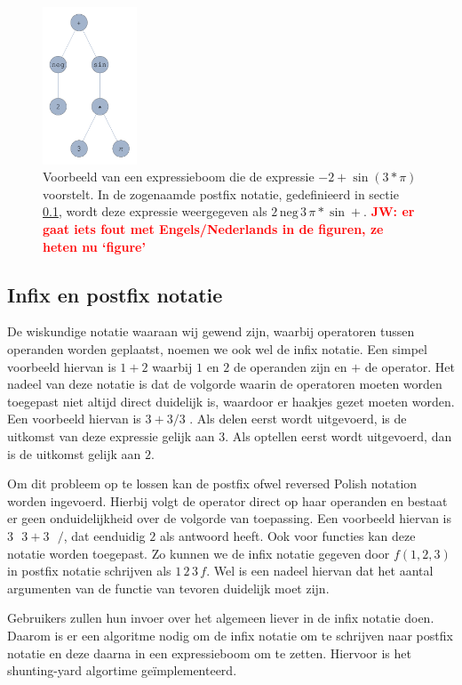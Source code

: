\documentclass[a4paper]{article}
\newcommand{\rcom}[1]{\textbf{\textcolor{red}{#1}}}
\begin{document}
\begin{figure}[!htb]
	\centering
	\includegraphics[width=0.25\textwidth]{expressionTree}
	\caption{Voorbeeld van een expressieboom die de expressie $-2+\sin(3 * \pi)$ voorstelt. In de zogenaamde postfix notatie, gedefinieerd in sectie \ref{sec:postfix}, wordt deze expressie weergegeven als $2\, \mathrm{neg}\,3\,\pi*\sin +$. \rcom{JW: er gaat iets fout met Engels/Nederlands in de figuren, ze heten nu `figure'}} \label{fig:boom}
\end{figure}

\subsection{Infix en postfix notatie}\label{sec:postfix}
De wiskundige notatie waaraan wij gewend zijn, waarbij operatoren tussen operanden worden geplaatst, noemen we ook wel de infix notatie. Een simpel voorbeeld hiervan is $1 + 2$  waarbij $1$ en $2$ de operanden zijn en $+$ de operator. Het nadeel van deze notatie is dat de volgorde waarin de operatoren moeten worden toegepast niet altijd direct duidelijk is, waardoor er haakjes gezet moeten worden. Een voorbeeld hiervan is $3+3 / 3$ . Als delen eerst wordt uitgevoerd, is de uitkomst van deze expressie gelijk aan $3$. Als optellen eerst wordt uitgevoerd, dan is de uitkomst gelijk aan $2$. 

Om dit probleem op te lossen kan de postfix ofwel reversed Polish notation worden ingevoerd. Hierbij volgt de operator direct op haar operanden en bestaat er geen onduidelijkheid over de volgorde van toepassing. Een voorbeeld hiervan is $3\text{ } 3 + 3 \text{ } /$, dat eenduidig $2$ als antwoord heeft. Ook voor functies kan deze notatie worden toegepast. Zo kunnen we de infix notatie gegeven door $f(1,2,3)$ in postfix notatie schrijven als $1\,2\,3\,f$. Wel is een  nadeel hiervan dat het aantal argumenten van de functie van tevoren duidelijk moet zijn.

Gebruikers zullen hun invoer over het algemeen liever in de infix notatie doen. Daarom is er een algoritme nodig om de infix notatie om te schrijven naar postfix notatie en deze daarna in een expressieboom om te zetten. Hiervoor is het shunting-yard algortime ge\"implementeerd.
\end{document}

